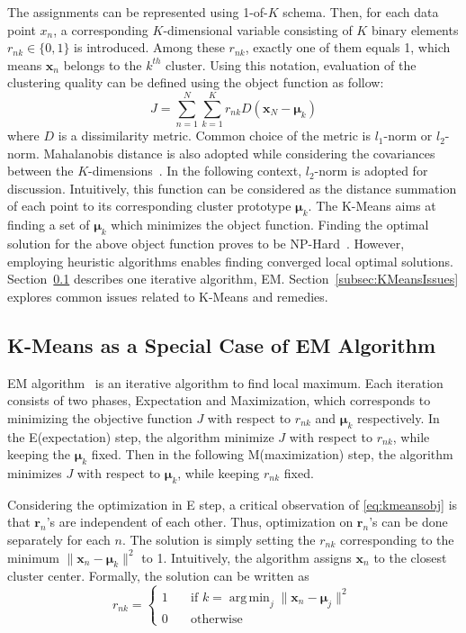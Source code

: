 The assignments can be represented using 1-of-$K$ schema. Then, for each data point $x_n$, a corresponding  $K$-dimensional variable consisting of $K$ binary elements $r_{nk} \in \{0, 1\}$ is introduced. Among these $r_{nk}$, exactly one of them equals 1, which means $\mathbf{x}_{n}$ belongs to the $k^{th}$ cluster. Using this notation, evaluation of the clustering quality can be defined using the object function as follow:
\begin{equation}	
	\label{eq:kmeansobj}
	J = \sum_{n=1}^{N}\sum_{k=1}^{K}r_{nk}D(\mathbf{x}_{N} - \boldsymbol{\mu}_{k})
\end{equation}
where $D$ is a dissimilarity metric. Common choice of the metric is $\mathit{l}_1$-norm or $\mathit{l}_2$-norm. Mahalanobis distance is also adopted while considering the covariances between the $K$-dimensions~\cite{davis1986statistics}. In the following context, $\mathit{l}_2$-norm is adopted for discussion. 
 Intuitively, this function can be considered as the distance summation of each point to its corresponding cluster prototype $\boldsymbol{\mu}_k$. The K-Means aims at finding a set of $\boldsymbol{\mu}_k$ which minimizes the object function. Finding the optimal solution for the above object function proves to be NP-Hard~\cite{aloise2009np}. However, employing heuristic algorithms enables finding converged local optimal solutions. Section~\ref{subsec:EM} describes one iterative algorithm, EM. Section~\ref{subsec:KMeansIssues} explores common issues related to K-Means and remedies.
\subsection{K-Means as a Special Case of EM Algorithm}
\label{subsec:EM}

EM algorithm~\cite{dempster1977maximum} is an iterative algorithm to find local maximum. Each iteration consists of two phases, Expectation and Maximization, which corresponds to minimizing the objective function $J$ with respect to $r_{nk}$ and $\boldsymbol{\mu}_{k}$ respectively. In the E(expectation) step, the algorithm minimize $J$ with respect to $r_{nk}$, while keeping the $\boldsymbol{\mu}_{k}$ fixed. Then in the following M(maximization) step, the algorithm minimizes $J$ with respect to $\boldsymbol{\mu}_{k}$, while keeping $r_{nk}$ fixed. 

Considering the optimization in E step, a critical observation of \eqref{eq:kmeansobj} is that \(\mathbf{r}_n\)'s are independent of each other. Thus, optimization on \(\mathbf{r}_n\)'s can be done separately for each \(n\). The solution is simply setting the \(r_{nk}\) corresponding to the minimum \(\| \mathbf{x}_n - \boldsymbol{\mu}_k \|^2\) to 1.  Intuitively, the algorithm assigns \(\mathbf{x}_n\) to the closest cluster center. Formally, the solution can be written as
\begin{equation}
 r_{nk} =
    \begin{cases}
        1   & \quad \text{if } k = \operatorname{arg\,min}_j \parallel \mathbf{x}_{n} - \mathbf{\mu}_{j} {\parallel}^2 \\
        0   & \quad \text{otherwise}
    \end{cases}
\end{equation}

